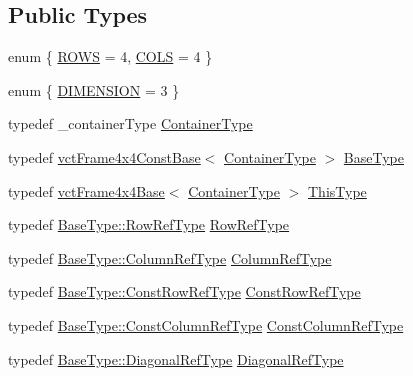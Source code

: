 \subsection*{Public Types}
\begin{DoxyCompactItemize}
\item 
enum \{ \hyperlink{classvct_frame4x4_base_a26b1c1cefff2caadb4e73d1a53bbb8cea5a040cca1b631b6453854b7d60ad2e83}{R\+O\+W\+S} = 4, 
\hyperlink{classvct_frame4x4_base_a26b1c1cefff2caadb4e73d1a53bbb8cea08b2236e42ee2a77673bf057cbd24599}{C\+O\+L\+S} = 4
 \}
\item 
enum \{ \hyperlink{classvct_frame4x4_base_a607a47903dc265e8d207c15dc7ca463ea10556ead0164a0b80c3a2f3e5f28b3a2}{D\+I\+M\+E\+N\+S\+I\+O\+N} = 3
 \}
\item 
typedef \+\_\+container\+Type \hyperlink{classvct_frame4x4_base_a3ae00d9c053676770458dc28ad41cc5a}{Container\+Type}
\item 
typedef \hyperlink{classvct_frame4x4_const_base}{vct\+Frame4x4\+Const\+Base}$<$ \hyperlink{classvct_frame4x4_base_a3ae00d9c053676770458dc28ad41cc5a}{Container\+Type} $>$ \hyperlink{classvct_frame4x4_base_afdce5a53de5e8e244a2e05b4843226bb}{Base\+Type}
\item 
typedef \hyperlink{classvct_frame4x4_base}{vct\+Frame4x4\+Base}$<$ \hyperlink{classvct_frame4x4_base_a3ae00d9c053676770458dc28ad41cc5a}{Container\+Type} $>$ \hyperlink{classvct_frame4x4_base_af6dcf167c0c3965872a095ce28853598}{This\+Type}
\item 
typedef \hyperlink{classvct_frame4x4_const_base_a4032e45bc1de2cf3ef9436aef57f1595}{Base\+Type\+::\+Row\+Ref\+Type} \hyperlink{classvct_frame4x4_base_a25703f0acac48328ee260245ddf4b2af}{Row\+Ref\+Type}
\item 
typedef \hyperlink{classvct_frame4x4_const_base_aa62cf0655339f6cbbe4c0b4323fe8dcf}{Base\+Type\+::\+Column\+Ref\+Type} \hyperlink{classvct_frame4x4_base_a5c1b952e27a3cafa0cc196c2a36c33e7}{Column\+Ref\+Type}
\item 
typedef \hyperlink{classvct_frame4x4_const_base_af18cadccba2812e0d3cad82f43583ab0}{Base\+Type\+::\+Const\+Row\+Ref\+Type} \hyperlink{classvct_frame4x4_base_a75f2ff66cb8cdd2322c576e7be0b94a1}{Const\+Row\+Ref\+Type}
\item 
typedef \hyperlink{classvct_frame4x4_const_base_a12760de72da52fc0917ad17373d369f3}{Base\+Type\+::\+Const\+Column\+Ref\+Type} \hyperlink{classvct_frame4x4_base_a3942845e934c9ac1ede2d499f92a760b}{Const\+Column\+Ref\+Type}
\item 
typedef \hyperlink{classvct_frame4x4_const_base_a6712c128a1d2b45ab9c713befeddf2c6}{Base\+Type\+::\+Diagonal\+Ref\+Type} \hyperlink{classvct_frame4x4_base_a838fede6632e0623204c42f3e49bce96}{Diagonal\+Ref\+Type}

\end{DoxyCompactItemize}
